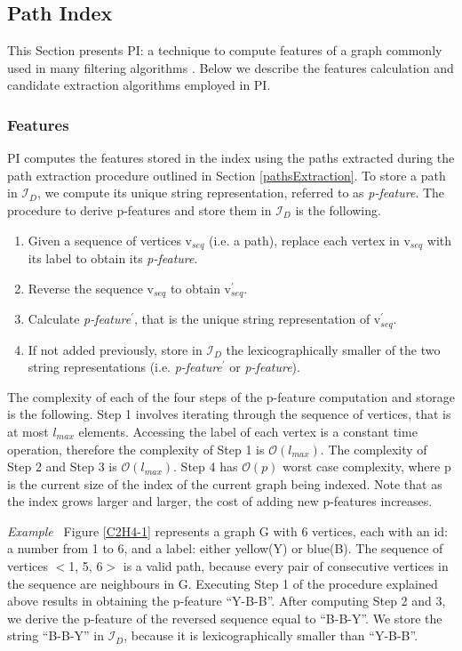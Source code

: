 \documentclass{l4proj}
\newcounter{example}[section]
\newenvironment{example}[1][]{\refstepcounter{example}\par\medskip
   \noindent \textit{Example~\theexample #1} \rmfamily}{\medskip}
\newcommand{\fancyI}{\mathcal{I}}
\begin{document}
\subsection{Path Index}
\label{path-index}
This Section presents PI: a technique to compute features of a graph commonly used in many filtering algorithms \cite{graphgrepsx}. Below we describe the features calculation and candidate extraction algorithms employed in PI.

\subsubsection{Features}
\label{pi:features}
PI computes the features stored in the index using the paths extracted during the path extraction procedure outlined in Section \ref{pathsExtraction}. To store a path in $\fancyI_{D}$, we compute its unique string representation, referred to as \emph{p-feature}. The procedure to derive p-features and store them in $\fancyI_{D}$ is the following.
\begin{enumerate}
\item Given a sequence of vertices v$_{seq}$ (i.e. a path), replace each vertex in v$_{seq}$ with its label to obtain its \emph{p-feature}.
\item Reverse the sequence v$_{seq}$ to obtain v$_{seq}^{\prime}$.
\item Calculate \emph{p-feature}$^{\prime}$, that is the unique string representation of v$_{seq}^{\prime}$.
\item If not added previously, store in $\fancyI_{D}$ the lexicographically smaller of the two string representations (i.e. \emph{p-feature}$^{\prime}$ or \emph{p-feature}).
\end{enumerate}

The complexity of each of the four steps of the p-feature computation and storage is the following. Step 1 involves iterating through the sequence of vertices, that is at most $l_{max}$ elements. Accessing the label of each vertex is a constant time operation, therefore the complexity of Step 1 is $\mathcal{O}(l_{max})$. The complexity of Step 2 and Step 3 is $\mathcal{O}(l_{max})$. Step 4 has $\mathcal{O}(p)$ worst case complexity, where p is the current size of the index of the current graph being indexed. Note that as the index grows larger and larger, the cost of adding new p-features increases.

\begin{example}
Figure \ref{C2H4-1} represents a graph G with 6 vertices, each with an id: a number from 1 to 6, and a label: either yellow(Y) or blue(B). The sequence of vertices $<$1, 5, 6$>$ is a valid path, because every pair of consecutive vertices in the sequence are neighbours in G. Executing Step 1 of the procedure explained above results in obtaining the p-feature ``Y-B-B''. After computing Step 2 and 3, we derive the p-feature of the reversed sequence equal to ``B-B-Y''. We store the string ``B-B-Y'' in $\fancyI_{D}$, because it is lexicographically smaller than ``Y-B-B''.
\end{example}
\end{document}
